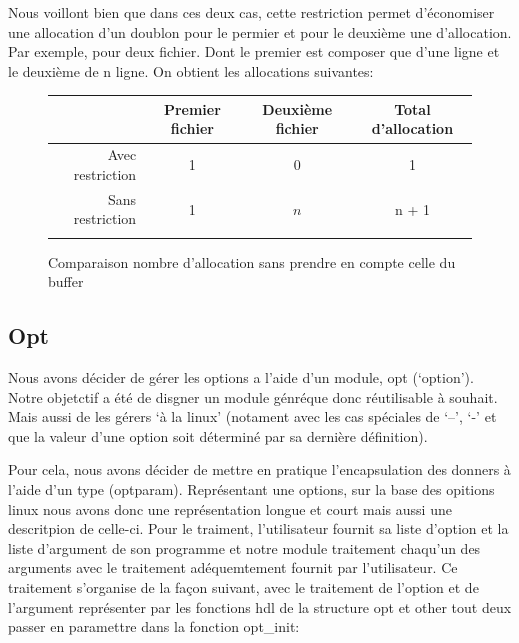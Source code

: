 \documentclass[12pt]{article}
\begin{document}
        Nous voillont bien que dans ces deux cas, cette restriction permet 
        d'économiser une allocation d'un doublon pour le permier et pour le 
        deuxième une d'allocation. Par exemple, pour deux fichier. Dont le 
        premier est composer que d'une ligne et le deuxième de n ligne. On 
        obtient les allocations suivantes:\\
        \begin{figure}[ht]
            \centering
            \begin{tabular}{ r c c c }
                \hline{}
                  \cellcolor{gray!25}     & Premier fichier & Deuxième fichier & 
                  Total d'allocation \\
                \hline{}
                Avec restriction  & 1 & 0 & 1 \\
                \hline{}
                Sans restriction & 1 & $n$ & n + 1\\
                \hline{}
            \end{tabular}
            \caption{Comparaison nombre d'allocation sans prendre en compte 
            celle du buffer}\label{tab-compar-da}
        \end{figure}

        
        \subsection{Opt}

        Nous avons décider de gérer les options a l'aide d'un module, opt 
        (`option'). Notre objetctif a été de disgner un module génréque donc 
        réutilisable à souhait. Mais aussi de les gérers `à la linux' (notament 
        avec les cas spéciales de `--', `-' et que la valeur d'une option soit 
        déterminé par sa dernière définition). 

        Pour cela, nous avons décider de mettre en pratique l'encapsulation des 
        donners à l'aide d'un type (optparam). Représentant une options, sur la 
        base des opitions linux nous avons donc une représentation longue et 
        court mais aussi une descritpion de celle-ci. Pour le traiment, 
        l'utilisateur fournit sa liste d'option et la liste d'argument de son 
        programme et notre module traitement chaqu'un des arguments avec le 
        traitement adéquemtement fournit par l'utilisateur. Ce traitement 
        s'organise de la façon suivant, avec le traitement de l'option et de 
        l'argument représenter par les fonctions hdl de la structure opt et 
        other tout deux passer en paramettre dans la fonction opt\_init:\\
\end{document}
